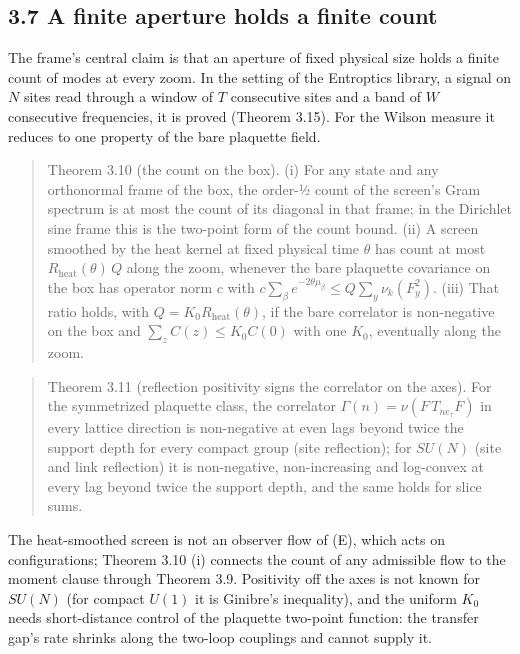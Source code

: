 \documentclass[10pt,letterpaper,twocolumn]{article}
\begin{document}
\subsection{3.7 A finite aperture holds a finite count}\label{37-a-finite-aperture-holds-a-finite-count}

The frame's central claim is that an aperture of fixed physical size holds a finite count of modes at every zoom. In the setting of the Entroptics library, a signal on \(N\) sites read through a window of \(T\) consecutive sites and a band of \(W\) consecutive frequencies, it is proved (Theorem 3.15). For the Wilson measure it reduces to one property of the bare plaquette field.

\begin{quote}
Theorem 3.10 (the count on the box). (i) For any state and any orthonormal frame of the box, the order-½ count of the screen's Gram spectrum is at most the count of its diagonal in that frame; in the Dirichlet sine frame this is the two-point form of the count bound. (ii) A screen smoothed by the heat kernel at fixed physical time \(\theta\) has count at most \(R_{\mathrm{heat}}(\theta)\,Q\) along the zoom, whenever the bare plaquette covariance on the box has operator norm \(c\) with \(c\sum_\beta e^{-2\theta\mu_\beta}\le Q\sum_y\nu_k(F_y^2)\). (iii) That ratio holds, with \(Q=K_0R_{\mathrm{heat}}(\theta)\), if the bare correlator is non-negative on the box and \(\sum_zC(z)\le K_0C(0)\) with one \(K_0\), eventually along the zoom.
\end{quote}

\begin{quote}
Theorem 3.11 (reflection positivity signs the correlator on the axes). For the symmetrized plaquette class, the correlator \(\Gamma(n)=\nu(F\,T_{ne_\tau}F)\) in every lattice direction is non-negative at even lags beyond twice the support depth for every compact group (site reflection); for \(SU(N)\) (site and link reflection) it is non-negative, non-increasing and log-convex at every lag beyond twice the support depth, and the same holds for slice sums.
\end{quote}

The heat-smoothed screen is not an observer flow of (E), which acts on configurations; Theorem 3.10 (i) connects the count of any admissible flow to the moment clause through Theorem 3.9. Positivity off the axes is not known for \(SU(N)\) (for compact \(U(1)\) it is Ginibre's inequality), and the uniform \(K_0\) needs short-distance control of the plaquette two-point function: the transfer gap's rate shrinks along the two-loop couplings and cannot supply it.
\end{document}
